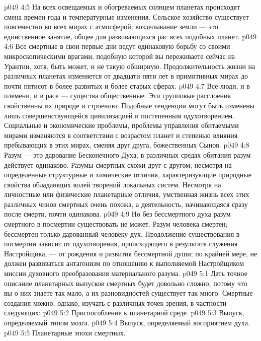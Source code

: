 \vs p049 4:5 \pc На всех освещаемых и обогреваемых солнцем планетах происходят смена времен года и температурные изменения. Сельское хозяйство существует повсеместно во всех мирах с атмосферой; возделывание земли --- это единственное занятие, общее для развивающихся рас всех подобных планет.
\vs p049 4:6 Все смертные в свои первые дни ведут одинаковую борьбу со своими микроскопическими врагами, подобную которой вы переживаете сейчас на Урантии, хотя, быть может, и не такую обширную. Продолжительность жизни на различных планетах изменяется от двадцати пяти лет в примитивных мирах до почти пятисот в более развитых и более старых сферах.
\vs p049 4:7 Все люди, и в племени, и в расе --- существа общественные. Эти групповые расслоения свойственны их природе и строению. Подобные тенденции могут быть изменены лишь совершенствующейся цивилизацией и постепенным одухотворением. Социальные и экономические проблемы, проблемы управления обитаемыми мирами изменяются в соответствии с возрастом планет и степенью влияния пребывающих в этих мирах, сменяя друг друга, божественных Сынов.
\vs p049 4:8 \pc Разум --- это дарование Бесконечного Духа; в различных средах обитания разум действует одинаково. Разумы смертных схожи друг с другом, несмотря на определенные структурные и химические отличия, характеризующие природные свойства обладающих волей творений локальных систем. Несмотря на личностные или физические планетарные отличия, умственная жизнь всех этих различных чинов смертных очень похожа, а деятельность, начинающаяся сразу после смерти, почти одинакова.
\vs p049 4:9 Но без бессмертного духа разум смертного в посмертии существовать не может. Разум человека смертен; бессмертен только дарованный человеку дух. Продолжение существования в посмертии зависит от одухотворения, происходящего в результате служения Настройщика, --- от рождения и развития бессмертной души; по крайней мере, не должен развиваться антагонизм по отношению к выполняемой Настройщиком миссии духовного преобразования материального разума.
\vs p049 5:1 Дать точное описание планетарных выпусков смертных будет довольно сложно, потому что вы о них знаете так мало, а их разновидностей существует так много. Смертные создания можно, однако, изучать с различных точек зрения, в частности следующих:
\vs p049 5:2 \bibnobreakspace Приспособление к планетарной среде.
\vs p049 5:3 \bibnobreakspace Выпуск, определяемый типом мозга.
\vs p049 5:4 \bibnobreakspace Выпуск, определяемый восприятием духа.
\vs p049 5:5 \bibnobreakspace Планетарные эпохи смертных.
